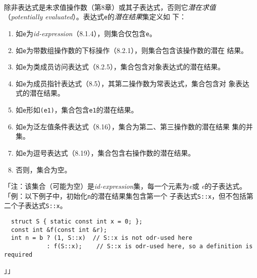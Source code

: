 \paragraph{}
除非表达式是未求值操作数（第8章）或其子表达式，否则它\textit{潜在求值}
（\textit{potentially evaluated}）。表达式\texttt{e}的\textit{潜在结果}集定义如
下：
\begin{enumerate}
  \item{如\texttt{e}为\textit{id-expression}（8.1.4），则集合仅包含\texttt{e}。}
  \item{如\texttt{e}为带数组操作数的下标操作（8.2.1），则集合包含该操作数的潜在
    结果。}
  \item{如\texttt{e}为类成员访问表达式（8.2.5），集合包含对象表达式的潜在结果。}
  \item{如\texttt{e}为成员指针表达式（8.5），其第二操作数为常表达式，集合包含对
    象表达式的潜在结果。}
  \item{如\texttt{e}形如\texttt{(e1)}，集合包含\texttt{e1}的潜在结果。}
  \item{如\texttt{e}为泛左值条件表达式（8.16），集合为第二、第三操作数的潜在结果
    集的并集。}
  \item{如\texttt{e}为逗号表达式（8.19），集合包含右操作数的潜在结果。}
  \item{否则，集合为空。}
\end{enumerate}
「注：该集合（可能为空）是\textit{id-expression}集，每一个元素为\textit{e}或
\textit{e}的子表达式。「例：以下例子中，初始化\texttt{n}的潜在结果集包含第一个
子表达式\texttt{S::x}，但不包括第二个子表达式\texttt{S::x}。
\begin{lstlisting}
  struct S { static const int x = 0; };
  const int &f(const int &r);
  int n = b ? (1, S::x)  // S::x is not odr-used here
            : f(S::x);    // S::x is odr-used here, so a definition is required
\end{lstlisting}」」

